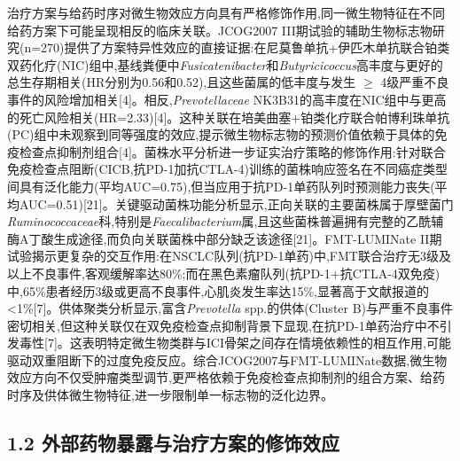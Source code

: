 \documentclass[11pt]{article}
\begin{document}
治疗方案与给药时序对微生物效应方向具有严格修饰作用,同一微生物特征在不同给药方案下可能呈现相反的临床关联。JCOG2007 III期试验的辅助生物标志物研究(n=270)提供了方案特异性效应的直接证据:在尼莫鲁单抗+伊匹木单抗联合铂类双药化疗(NIC)组中,基线粪便中\emph{Fusicatenibacter}和\emph{Butyricicoccus}高丰度与更好的总生存期相关(HR分别为0.56和0.52),且这些菌属的低丰度与发生 \(\geq\) 4级严重不良事件的风险增加相关{[}4{]}。相反,\emph{Prevotellaceae} NK3B31的高丰度在NIC组中与更高的死亡风险相关(HR=2.33){[}4{]}。这种关联在培美曲塞+铂类化疗联合帕博利珠单抗(PC)组中未观察到同等强度的效应,提示微生物标志物的预测价值依赖于具体的免疫检查点抑制剂组合{[}4{]}。菌株水平分析进一步证实治疗策略的修饰作用:针对联合免疫检查点阻断(CICB,抗PD-1加抗CTLA-4)训练的菌株响应签名在不同癌症类型间具有泛化能力(平均AUC=0.75),但当应用于抗PD-1单药队列时预测能力丧失(平均AUC=0.51){[}21{]}。关键驱动菌株功能分析显示,正向关联的主要菌株属于厚壁菌门\emph{Ruminococcaceae}科,特别是\emph{Faecalibacterium}属,且这些菌株普遍拥有完整的乙酰辅酶A丁酸生成途径,而负向关联菌株中部分缺乏该途径{[}21{]}。FMT-LUMINate II期试验揭示更复杂的交互作用:在NSCLC队列(抗PD-1单药)中,FMT联合治疗无3级及以上不良事件,客观缓解率达80\%;而在黑色素瘤队列(抗PD-1+抗CTLA-4双免疫)中,65\%患者经历3级或更高不良事件,心肌炎发生率达15\%,显著高于文献报道的\textless1\%{[}7{]}。供体聚类分析显示,富含\emph{Prevotella} spp.的供体(Cluster B)与严重不良事件密切相关,但这种关联仅在双免疫检查点抑制背景下显现,在抗PD-1单药治疗中不引发毒性{[}7{]}。这表明特定微生物类群与ICI骨架之间存在情境依赖性的相互作用,可能驱动双重阻断下的过度免疫反应。综合JCOG2007与FMT-LUMINate数据,微生物效应方向不仅受肿瘤类型调节,更严格依赖于免疫检查点抑制剂的组合方案、给药时序及供体微生物特征,进一步限制单一标志物的泛化边界。

\subsection{1.2 外部药物暴露与治疗方案的修饰效应}\label{ux5916ux90e8ux836fux7269ux66b4ux9732ux4e0eux6cbbux7597ux65b9ux6848ux7684ux4feeux9970ux6548ux5e94}
\end{document}
